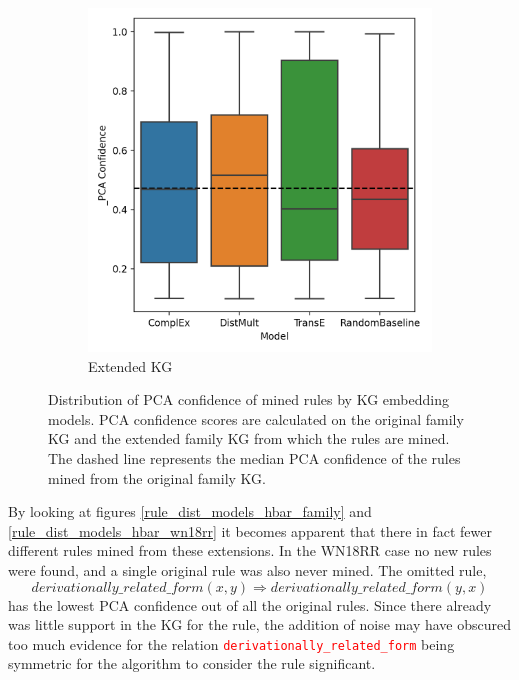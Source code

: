 \begin{figure}[htbp]
\begin{subfigure}{.5\textwidth}
  \includegraphics[width=1\linewidth]{figures/results/PCA_models/_PCA-models_family.png}
  \caption{Extended KG}
  \label{fig:_PCA_models_family_boxplot_sub}
\end{subfigure}
\caption[Dist. of PCA conf. rules by KG embedding models - family KG.]{Distribution of PCA confidence of mined rules by KG embedding models. PCA confidence scores are calculated on the original family KG and the extended family KG from which the rules are mined. The dashed line represents the median PCA confidence of the rules mined from the original family KG.}
\label{fig:PCA_models_family_boxplot}
\end{figure}

By looking at figures \ref{rule_dist_models_hbar_family} and \ref{rule_dist_models_hbar_wn18rr} it becomes apparent that there in fact fewer different rules mined from these extensions. In the WN18RR case no new rules were found, and a single original rule was also never mined. The omitted rule,
\[derivationally\_related\_form(x, y)   \Rightarrow derivationally\_related\_form(y, x)\]
has the lowest PCA confidence out of all the original rules. Since there already was little support in the KG for the rule, the addition of noise may have obscured too much evidence for the relation \textcolor{red}{\texttt{derivationally\_related\_form}} being symmetric for the algorithm to consider the rule significant. 

